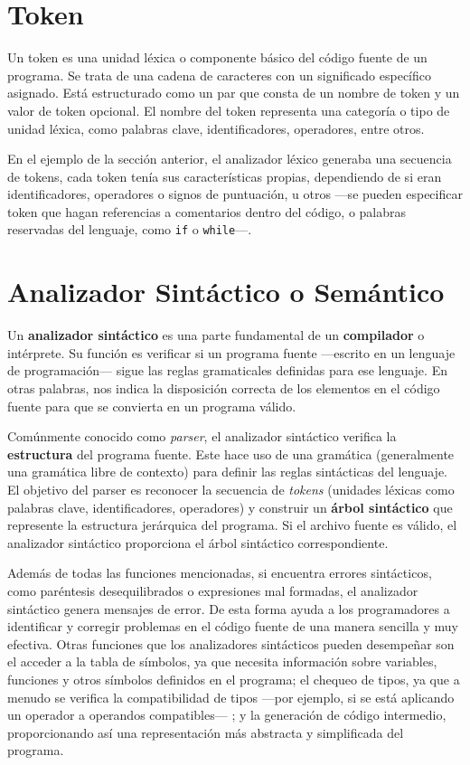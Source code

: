 \lstset{inputencoding=utf8/latin1}


\section{Token}
Un token es una unidad léxica o componente básico del código fuente de un programa. Se trata de una cadena de caracteres con un significado específico asignado. Está estructurado como un par que consta de un nombre de token y un valor de token opcional. El nombre del token representa una categoría o tipo de unidad léxica, como palabras clave, identificadores, operadores, entre otros\cite{token}.

En el ejemplo de la sección anterior, el analizador léxico generaba una secuencia de tokens, cada token tenía sus características propias, dependiendo de si eran identificadores, operadores o signos de puntuación, u otros ---se pueden especificar token que hagan referencias a comentarios dentro del código, o palabras reservadas del lenguaje, como \lstinline[keywordstyle=\color{black}]|if| o \lstinline[keywordstyle=\color{black}]|while|---.


\section{Analizador Sintáctico o Semántico}
Un \textbf{analizador sintáctico} es una parte fundamental de un \textbf{compilador} o intérprete. Su función es verificar si un programa fuente ---escrito en un lenguaje de programación--- sigue las reglas gramaticales definidas para ese lenguaje\cite{analizadorsintactico}. En otras palabras, nos indica la disposición correcta de los elementos en el código fuente para que se convierta en un programa válido.

Comúnmente conocido como \textit{parser}, el analizador sintáctico verifica la \textbf{estructura} del programa fuente. Este hace uso de una gramática (generalmente una gramática libre de contexto) para definir las reglas sintácticas del lenguaje. El objetivo del parser es reconocer la secuencia de \textit{tokens} (unidades léxicas como palabras clave, identificadores, operadores) y construir un \textbf{árbol sintáctico} que represente la estructura jerárquica del programa. Si el archivo fuente es válido, el analizador sintáctico proporciona el árbol sintáctico correspondiente.

Además de todas las funciones mencionadas, si encuentra errores sintácticos, como paréntesis desequilibrados o expresiones mal formadas, el analizador sintáctico genera mensajes de error\cite{traductorescompiladoreseinterpretes}. De esta forma ayuda a los programadores a identificar y corregir problemas en el código fuente de una manera sencilla y muy efectiva. Otras funciones que los analizadores sintácticos pueden desempeñar son el acceder a la tabla de símbolos, ya que necesita información sobre variables, funciones y otros símbolos definidos en el programa; el chequeo de tipos, ya que a menudo se verifica la compatibilidad de tipos ---por ejemplo, si se está aplicando un operador a operandos compatibles--- ; y la generación de código intermedio, proporcionando así una representación más abstracta y simplificada del programa.

